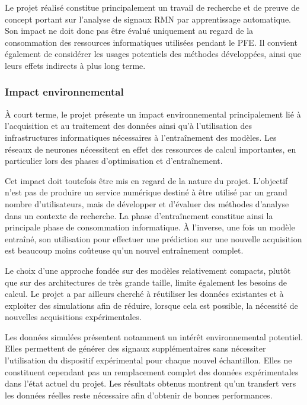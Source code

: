 \documentclass[12pt,a4paper,twoside]{article}
\begin{document}
Le projet réalisé constitue principalement un travail de recherche et de preuve de concept portant sur l'analyse de signaux RMN par apprentissage automatique. Son impact ne doit donc pas être évalué uniquement au regard de la consommation des ressources informatiques utilisées pendant le PFE. Il convient également de considérer les usages potentiels des méthodes développées, ainsi que leurs effets indirects à plus long terme.

\subsubsection{Impact environnemental}
\label{subsubsec:rse_impact_environnemental}

À court terme, le projet présente un impact environnemental principalement lié à l'acquisition et au traitement des données ainsi qu'à l'utilisation des infrastructures informatiques nécessaires à l'entraînement des modèles. Les réseaux de neurones nécessitent en effet des ressources de calcul importantes, en particulier lors des phases d'optimisation et d'entraînement.

Cet impact doit toutefois être mis en regard de la nature du projet. L'objectif n'est pas de produire un service numérique destiné à être utilisé par un grand nombre d'utilisateurs, mais de développer et d'évaluer des méthodes d'analyse dans un contexte de recherche. La phase d'entraînement constitue ainsi la principale phase de consommation informatique. À l'inverse, une fois un modèle entraîné, son utilisation pour effectuer une prédiction sur une nouvelle acquisition est beaucoup moins coûteuse qu'un nouvel entraînement complet.

Le choix d'une approche fondée sur des modèles relativement compacts, plutôt que sur des architectures de très grande taille, limite également les besoins de calcul. Le projet a par ailleurs cherché à réutiliser les données existantes et à exploiter des simulations afin de réduire, lorsque cela est possible, la nécessité de nouvelles acquisitions expérimentales.

Les données simulées présentent notamment un intérêt environnemental potentiel. Elles permettent de générer des signaux supplémentaires sans nécessiter l'utilisation du dispositif expérimental pour chaque nouvel échantillon. Elles ne constituent cependant pas un remplacement complet des données expérimentales dans l'état actuel du projet. Les résultats obtenus montrent qu'un transfert vers les données réelles reste nécessaire afin d'obtenir de bonnes performances.
\end{document}
